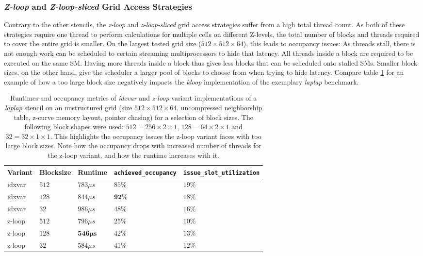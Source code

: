\subsubsection{\emph{Z-loop} and \emph{Z-loop-sliced} Grid Access Strategies}
Contrary to the other stencils, the \emph{z-loop} and \emph{z-loop-sliced} grid access strategies suffer from a high total thread count. As both of these strategies require one thread to perform calculations for multiple cells on different Z-levels, the total number of blocks and threads required to cover the entire grid is smaller. On the largest tested grid size ($512\times 512\times 64$), this leads to occupancy issues: As threads stall, there is not enough work can be scheduled to certain streaming multiprocessors to hide that latency. All threads inside a block are required to be executed on the same SM. Having more threads inside a block thus gives less blocks that can be scheduled onto stalled SMs. Smaller block sizes, on the other hand, give the scheduler a larger pool of blocks to choose from when trying to hide latency. Compare table \ref{tab:laplap-blocksize-occupancy} for an example of how a too large block size negatively impacts the \emph{kloop} implementation of the exemplary \emph{laplap} benchmark.

\begin{table}
	\begin{tabular}{l l l p{2.5cm} p{2.5cm}}
		\textbf{Variant} & \textbf{Blocksize} & \textbf{Runtime} & \textbf{\texttt{achieved\_\allowbreak occupancy}} & \textbf{\texttt{issue\_\allowbreak slot\_\allowbreak utilization}} \\
		\hline
		idxvar & $512$ & $783\mu s$ & $85\%$ & $19\%$ \\
		idxvar & $128$ & $844\mu s$ & $\mathbf{92\%}$ & $18\%$ \\
		idxvar & $32$  & $986\mu s$ & $48\%$ & $16\%$ \\
		z-loop & $512$ & $796\mu s$ & $25\%$ & $10\%$\\
		z-loop & $128$ & $\mathbf{546\mu s}$ & $42\%$ & $13\%$ \\ 
		z-loop & $32$  & $584\mu s$ & $41\%$ & $12\%$
	\end{tabular}
	\caption{\label{tab:laplap-blocksize-occupancy} Runtimes and occupancy metrics of \emph{idxvar} and \emph{z-loop} variant implementations of a \emph{laplap} stencil on an unstructured grid (size $512\times 512\times 64$, uncompressed neighborship table, z-curve memory layout, pointer chasing) for a selection of block sizes. The following block shapes were used: $512 = 256\times 2\times 1$, $128 = 64\times 2\times 1$ and $32 = 32\times 1 \times 1$. This highlights the occupancy issues the z-loop variant faces with too large block sizes. Note how the occupancy drops with increased number of threads for the z-loop variant, and how the runtime increases with it.}
\end{table}
